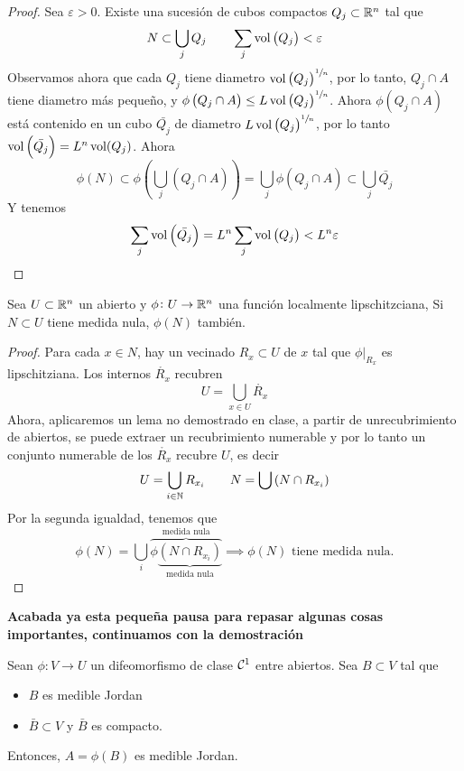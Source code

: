 \begin{proof}
    Sea $\varepsilon > 0$. Existe una sucesión de cubos compactos $Q_j \subset \mathbb{R}^n$ tal que
    \[
        N \subset \bigcup_j Q_j \qquad \sum_j \operatorname{vol}\left( Q_j \right) < \varepsilon
    \]
    Observamos ahora que cada $Q_j$ tiene diametro $\operatorname{vol}\left( Q_j \right)^{\sfrac{1}{n}}$, por lo tanto,
    $Q_j \cap A$ tiene diametro más pequeño, y $\phi\left( Q_j \cap A \right) \leq L \operatorname{vol}\left( Q_j \right)^{\sfrac{1}{n}}$. Ahora
    $\phi\left( Q_j \cap A \right)$ está contenido en un cubo $\bar{Q_j}$ de diametro $L \operatorname{vol}\left( Q_j \right)^{\sfrac{1}{n}}$, por lo tanto
    $\operatorname{vol}\left( \bar{Q_j} \right) = L^n \operatorname{vol}(Q_j)$. Ahora
    \[
        \phi(N) \subset \phi\left( \bigcup_{j} \left( Q_j \cap A \right) \right) = \bigcup_j \phi\left( Q_j \cap A \right) \subset \bigcup_j \bar{Q_j}
    \]
    Y tenemos
    \[
        \sum_j \operatorname{vol}\left( \bar{Q_j} \right) = L^n \sum_j \operatorname{vol}\left( Q_j \right) < L^n \varepsilon
    \]
\end{proof}

\begin{lema*}
    Sea $U \subset \mathbb{R}^n$ un abierto y $\phi \colon U \to \mathbb{R}^n$ una función localmente lipschitzciana, Si $N \subset U$ tiene
    medida nula, $\phi(N)$ tambi\'en.
\end{lema*}

\begin{proof}
    Para  cada $x \in N$, hay un vecinado $R_x \subset U$ de $x$ tal que $\phi\vert_{R_x}$ es lipschitziana. Los internos $\mathring{R_x}$ recubren
    \[
        U = \bigcup_{x \in U} \mathring{R_x}
    \]
    Ahora, aplicaremos un lema no demostrado en clase, a partir de unrecubrimiento de abiertos, se puede extraer un recubrimiento numerable y por lo tanto
    un conjunto numerable de los $\mathring{R_x}$ recubre $U$, es decir
    \[
        U =\bigcup_{i \in \mathbb{N}} R_{x_i} \qquad N = \bigcup\left( N \cap R_{x_i} \right)
    \]
    Por la segunda igualdad, tenemos que
    \[
        \phi(N) =\bigcup_{i} \overbrace{\phi \underbrace{\left(N \cap R_{x_i}\right)}_{\text{medida nula}} }^{\text{medida nula}} \implies
        \phi(N) \text{ tiene medida nula.}
    \]
\end{proof}

\textbf{Acabada ya esta pequeña pausa para repasar algunas cosas importantes, continuamos con la demostración}

\begin{lema*}[0]\label{lema:cero_cambio}
    Sean $\phi \colon V \to U$ un difeomorfismo de clase $\mathcal{C}^1$ entre abiertos. Sea $B \subset V$ tal que
    \begin{itemize}
        \item $B$ es medible Jordan
        \item $\bar{B} \subset V$ y $\bar{B}$ es compacto.
    \end{itemize}
    Entonces, $A = \phi(B)$ es medible Jordan.
\end{lema*}

